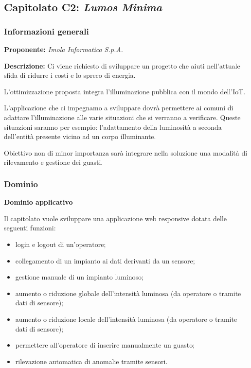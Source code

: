 \subsection{Capitolato C2: \textit{Lumos Minima}}
\subsubsection{Informazioni generali}
\textbf{Proponente:} \textit{Imola Informatica S.p.A.}

\textbf{Descrizione:} Ci viene richiesto di sviluppare un progetto che aiuti nell'attuale sfida di ridurre i costi e lo spreco di energia.

L'ottimizzazione proposta integra l'illuminazione pubblica con il mondo dell'IoT.

L'applicazione che ci impegnamo a sviluppare dovrà permettere ai comuni di adattare l'illuminazione alle varie situazioni che si verranno a verificare. Queste situazioni saranno per esempio: l'adattamento della luminosità a seconda dell'entità presente vicino ad un corpo illuminante.

Obiettivo non di minor importanza sarà integrare nella soluzione una modalità di rilevamento e gestione dei guasti. 

\subsubsection{Dominio}

\textbf{Dominio applicativo}

Il capitolato vuole sviluppare una applicazione web responsive dotata delle seguenti funzioni:
\begin{itemize}
    \item login e logout di un'operatore;
    \item collegamento di un impianto ai dati derivanti da un sensore;
    \item gestione manuale di un impianto luminoso;
    \item aumento o riduzione globale dell'intensità luminosa (da operatore o tramite dati di sensore);
    \item aumento o riduzione locale dell'intensità luminosa (da operatore o tramite dati di sensore);
    \item permettere all'operatore di inserire manualmente un guasto;
    \item rilevazione automatica di anomalie tramite sensori.
\end{itemize}

